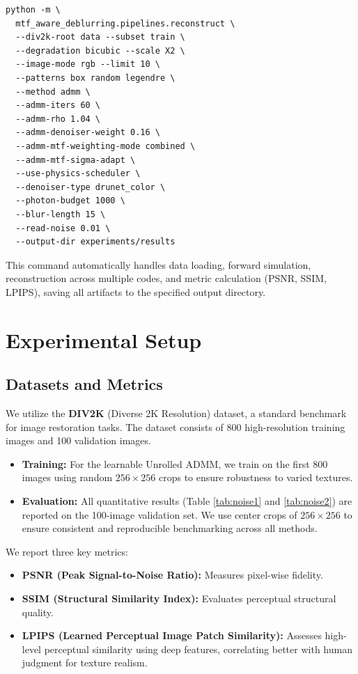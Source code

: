 \documentclass[10pt,journal,compsoc]{IEEEtran}
\begin{document}
\begin{verbatim}
python -m \
  mtf_aware_deblurring.pipelines.reconstruct \
  --div2k-root data --subset train \
  --degradation bicubic --scale X2 \
  --image-mode rgb --limit 10 \
  --patterns box random legendre \
  --method admm \
  --admm-iters 60 \
  --admm-rho 1.04 \
  --admm-denoiser-weight 0.16 \
  --admm-mtf-weighting-mode combined \
  --admm-mtf-sigma-adapt \
  --use-physics-scheduler \
  --denoiser-type drunet_color \
  --photon-budget 1000 \
  --blur-length 15 \
  --read-noise 0.01 \
  --output-dir experiments/results
\end{verbatim}

This command automatically handles data loading, forward simulation, reconstruction across multiple codes, and metric calculation (PSNR, SSIM, LPIPS), saving all artifacts to the specified output directory.

\section{Experimental Setup}
\subsection{Datasets and Metrics}
We utilize the \textbf{DIV2K} (Diverse 2K Resolution) dataset, a standard benchmark for image restoration tasks. The dataset consists of 800 high-resolution training images and 100 validation images.
\begin{itemize}
    \item \textbf{Training:} For the learnable Unrolled ADMM, we train on the first 800 images using random $256 \times 256$ crops to ensure robustness to varied textures.
    \item \textbf{Evaluation:} All quantitative results (Table \ref{tab:noise1} and \ref{tab:noise2}) are reported on the 100-image validation set. We use center crops of $256 \times 256$ to ensure consistent and reproducible benchmarking across all methods.
\end{itemize}
We report three key metrics:
\begin{itemize}
    \item \textbf{PSNR (Peak Signal-to-Noise Ratio):} Measures pixel-wise fidelity.
    \item \textbf{SSIM (Structural Similarity Index):} Evaluates perceptual structural quality.
    \item \textbf{LPIPS (Learned Perceptual Image Patch Similarity):} Assesses high-level perceptual similarity using deep features, correlating better with human judgment for texture realism.
\end{itemize}
\end{document}
